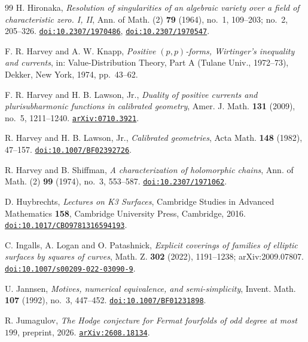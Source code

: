 \documentclass[11pt,reqno]{amsart}
\theoremstyle{plain}
\theoremstyle{definition}
\theoremstyle{remark}
\begin{document}
\begin{thebibliography}{99}
H. Hironaka,
\emph{Resolution of singularities of an algebraic variety over a field of
characteristic zero. I, II},
Ann. of Math. (2) \textbf{79} (1964), no.~1, 109--203; no.~2, 205--326.
\href{https://doi.org/10.2307/1970486}{\texttt{doi:10.2307/1970486}},
\href{https://doi.org/10.2307/1970547}{\texttt{doi:10.2307/1970547}}.

F. R. Harvey and A. W. Knapp,
\emph{Positive $(p,p)$-forms, Wirtinger's inequality and currents},
in: Value-Distribution Theory, Part A (Tulane Univ., 1972--73),
Dekker, New York, 1974, pp.~43--62.

F. R. Harvey and H. B. Lawson, Jr.,
\emph{Duality of positive currents and plurisubharmonic functions in
calibrated geometry},
Amer. J. Math. \textbf{131} (2009), no.~5, 1211--1240.
\href{https://arxiv.org/abs/0710.3921}{\texttt{arXiv:0710.3921}}.

R. Harvey and H. B. Lawson, Jr.,
\emph{Calibrated geometries},
Acta Math. \textbf{148} (1982), 47--157.
\href{https://doi.org/10.1007/BF02392726}{\texttt{doi:10.1007/BF02392726}}.

R. Harvey and B. Shiffman,
\emph{A characterization of holomorphic chains},
Ann. of Math. (2) \textbf{99} (1974), no.~3, 553--587.
\href{https://doi.org/10.2307/1971062}{\texttt{doi:10.2307/1971062}}.

D. Huybrechts,
\emph{Lectures on K3 Surfaces},
Cambridge Studies in Advanced Mathematics \textbf{158},
Cambridge University Press, Cambridge, 2016.
\href{https://doi.org/10.1017/CBO9781316594193}{\texttt{doi:10.1017/CBO9781316594193}}.

C. Ingalls, A. Logan and O. Patashnick,
\emph{Explicit coverings of families of elliptic surfaces by squares of
curves},
Math. Z. \textbf{302} (2022), 1191--1238; arXiv:2009.07807.
\href{https://doi.org/10.1007/s00209-022-03090-9}{\texttt{doi:10.1007/s00209-022-03090-9}}.

U. Jannsen,
\emph{Motives, numerical equivalence, and semi-simplicity},
Invent. Math. \textbf{107} (1992), no.~3, 447--452.
\href{https://doi.org/10.1007/BF01231898}{\texttt{doi:10.1007/BF01231898}}.

R. Jumagulov,
\emph{The Hodge conjecture for Fermat fourfolds of odd degree at most
$199$},
preprint, 2026.
\href{https://arxiv.org/abs/2608.18134}{\texttt{arXiv:2608.18134}}.


\end{thebibliography}
\end{document}
